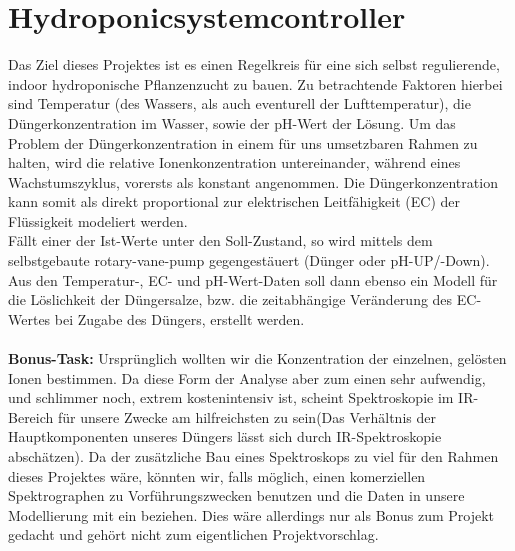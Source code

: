 \section{Hydroponicsystemcontroller}

Das Ziel dieses Projektes ist es einen Regelkreis für eine sich selbst regulierende, indoor hydroponische Pflanzenzucht zu bauen. Zu betrachtende Faktoren hierbei sind Temperatur (des Wassers, als auch eventurell der Lufttemperatur), die Düngerkonzentration im Wasser, sowie der pH-Wert der Lösung. Um das Problem der Düngerkonzentration in einem für uns umsetzbaren Rahmen zu halten, wird die relative Ionenkonzentration untereinander, während eines Wachstumszyklus, vorersts als konstant angenommen. Die Düngerkonzentration kann somit als direkt proportional zur elektrischen Leitfähigkeit (EC) der Flüssigkeit modeliert werden.\\
Fällt einer der Ist-Werte unter den Soll-Zustand, so wird mittels dem selbstgebaute rotary-vane-pump gegengestäuert (Dünger oder pH-UP/-Down).\\
Aus den Temperatur-, EC- und pH-Wert-Daten soll dann ebenso ein Modell für die Löslichkeit der Düngersalze, bzw. die zeitabhängige Veränderung des EC-Wertes bei Zugabe des Düngers, erstellt werden.\\
\\
\textbf{Bonus-Task:}
Ursprünglich wollten wir die Konzentration der einzelnen, gelösten Ionen bestimmen. Da diese Form der Analyse aber zum einen sehr aufwendig, und schlimmer noch, extrem kostenintensiv ist, scheint Spektroskopie im IR-Bereich für unsere Zwecke am hilfreichsten zu sein(Das Verhältnis der Hauptkomponenten unseres Düngers lässt sich durch IR-Spektroskopie abschätzen). Da der zusätzliche Bau eines Spektroskops zu viel für den Rahmen dieses Projektes wäre, könnten wir, falls möglich, einen komerziellen Spektrographen zu Vorführungszwecken benutzen und die Daten in unsere Modellierung mit ein beziehen. Dies wäre allerdings nur als Bonus zum Projekt gedacht und gehört nicht zum eigentlichen Projektvorschlag.
